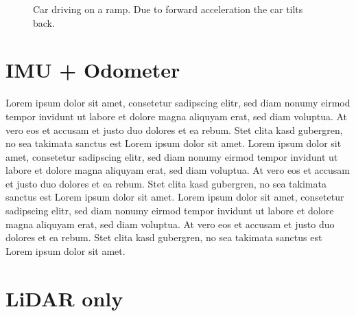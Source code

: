 \begin{figure}[htpb]
	\caption{Car driving on a ramp. Due to forward acceleration the car tilts back.}
\end{figure}

\section{IMU + Odometer}
Lorem ipsum dolor sit amet, consetetur sadipscing elitr, sed diam nonumy eirmod tempor invidunt ut labore et dolore magna aliquyam erat, sed diam voluptua. At vero eos et accusam et justo duo dolores et ea rebum. Stet clita kasd gubergren, no sea takimata sanctus est Lorem ipsum dolor sit amet. Lorem ipsum dolor sit amet, consetetur sadipscing elitr, sed diam nonumy eirmod tempor invidunt ut labore et dolore magna aliquyam erat, sed diam voluptua. At vero eos et accusam et justo duo dolores et ea rebum. Stet clita kasd gubergren, no sea takimata sanctus est Lorem ipsum dolor sit amet. Lorem ipsum dolor sit amet, consetetur sadipscing elitr, sed diam nonumy eirmod tempor invidunt ut labore et dolore magna aliquyam erat, sed diam voluptua. At vero eos et accusam et justo duo dolores et ea rebum. Stet clita kasd gubergren, no sea takimata sanctus est Lorem ipsum dolor sit amet.

\section{LiDAR only}

